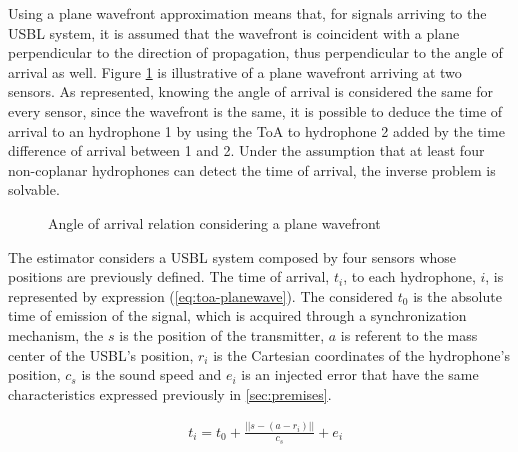 Using a plane wavefront approximation means that, for signals arriving to the USBL system, it is assumed that the wavefront is coincident with a plane perpendicular to the direction of propagation, thus perpendicular to the angle of arrival as well. Figure \ref{fig:plane-wavefront} is illustrative of a plane wavefront arriving at two sensors. As represented, knowing the angle of arrival is considered the same for every sensor, since the wavefront is the same, it is possible to deduce the time of arrival to an hydrophone 1 by using the ToA to hydrophone 2 added by the time difference of arrival between 1 and 2. Under the assumption that at least four non-coplanar hydrophones can detect the time of arrival, the inverse problem is solvable.

\begin{figure}[!htbp]
	\captionsetup{justification=centering,margin=2cm}
	\caption{Angle of arrival relation considering a plane wavefront}
	\label{fig:plane-wavefront}
\end{figure}

The estimator considers a USBL system composed by four sensors whose positions are previously defined. The time of arrival, $t_i$, to each hydrophone, $i$, is represented by expression (\ref{eq:toa-planewave}). The considered $t_0$ is the absolute time of emission of the signal, which is acquired through a synchronization mechanism, the $s$ is the position of the transmitter, $a$ is referent to the mass center of the USBL's position, $r_i$ is the Cartesian coordinates of the hydrophone's position, $c_s$ is the sound speed and $e_i$ is an injected error that have the same characteristics expressed previously in \ref{sec:premises}.

\begin{eqnarray}
& t_i = t_0 + \frac{ ||s - (a - r_i)|| }{c_s} + e_i
\label{eq:toa-planewave}
\end{eqnarray}

